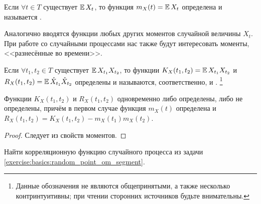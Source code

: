 \begin{definition}
    \label{definition:basics:mean_function}
    Если $ \forall t \in T $ существует $ \operatorname{\mathbb{E}} X_t $,
    то функция $ m_X(t) = \operatorname{\mathbb{E}} X_t $ определена и называется .
\end{definition}

Аналогично вводятся функции любых других моментов случайной величины $ X_t $.
При работе со случайными процессами нас также будут интересовать моменты,
<<разнесённые во времени>>.

\begin{definition}
    \label{definition:basics:second_order_moment_functions}
    Если $ \forall t_1, t_2 \in T $ существует $ \operatorname{\mathbb{E}} X_{t_1} X_{t_2} $,
    то функции $ K_X(t_1, t_2) = \operatorname{\mathbb{E}} X_{t_1} X_{t_2} $ и $ R_X(t_1, t_2) = \operatorname{\mathbb{E}} \mathring{X}_{t_1} \mathring{X}_{t_2} $
    определены и называются, соответственно,  и .%
    \footnote{Данные обозначения не являются общепринятыми, а также несколько контринтуитивны; при чтении сторонних источников будьте внимательны.}
\end{definition}

\begin{statement}
    \label{statement:basics:correlation_and_covariation_connection}
    Функции $ K_X(t_1, t_2) $ и $ R_X(t_1, t_2) $ одновременно либо определены, либо не определены,
    причём в первом случае функция $ m_X(t) $ определена и $ R_X(t_1, t_2) = K_X(t_1, t_2) - m_X(t_1) m_X(t_2) $.
\end{statement}

\begin{proof}
    Следует из свойств моментов.
\end{proof}

\begin{Exercise}[counter=SecExercise, label={exercise:basics:random_point_om_segment_moments}]
    \noindent
    Найти корреляционную функцию случайного процесса из задачи \ref{exercise:basics:random_point_om_segment}.
\end{Exercise}

